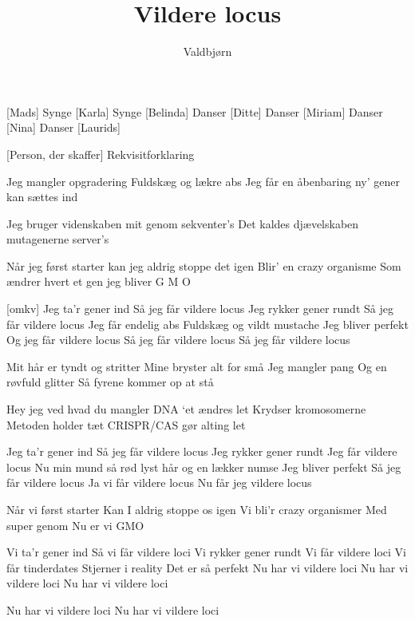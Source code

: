 \documentclass[a4paper,11pt]{article}
\title{Vildere locus}
\author{Valdbjørn}
\begin{document}
\maketitle

\begin{roles}
    [Mads] Synge
    [Karla] Synge 
    [Belinda] Danser
    [Ditte] Danser
    [Miriam] Danser
    [Nina] Danser
    [Laurids]
\end{roles}

\begin{props}
    [Person, der skaffer] Rekvisitforklaring
\end{props}

\begin{song}
  Jeg mangler opgradering
Fuldskæg og lækre abs
Jeg får en åbenbaring
ny’ gener kan sættes ind

  Jeg bruger videnskaben
mit genom sekventer’s
Det kaldes djævelskaben
mutagenerne server's

  Når jeg først starter
kan jeg aldrig stoppe det igen
Blir' en crazy organisme
Som ændrer hvert et gen
jeg bliver G M O

  [omkv]
Jeg ta’r gener ind
Så jeg får vildere locus
Jeg rykker gener rundt
Så jeg får vildere locus
Jeg får endelig abs
Fuldskæg og vildt mustache 
Jeg bliver perfekt
Og jeg får vildere locus
Så jeg får vildere locus
Så jeg får vildere locus

Mit hår er tyndt og stritter
Mine bryster alt for små
Jeg mangler pang
Og en røvfuld glitter
Så fyrene kommer op at stå

Hey jeg ved hvad du mangler
DNA ‘et ændres let
Krydser kromosomerne
Metoden holder tæt
CRISPR/CAS gør alting let

Jeg ta’r gener ind
Så jeg får vildere locus
Jeg rykker gener rundt
Jeg får vildere locus
Nu min mund så rød
lyst hår og en lækker numse 
Jeg bliver perfekt
Så jeg får vildere locus
Ja vi får vildere locus
Nu får jeg vildere locus

Når vi først starter
Kan I aldrig stoppe os igen
Vi bli'r crazy organismer
Med super genom 
Nu er vi GMO

  Vi ta’r gener ind
Så vi får vildere loci
Vi rykker gener rundt
Vi får vildere loci
Vi får tinderdates
Stjerner i reality  
Det er så perfekt 
Nu har vi vildere loci
Nu har vi vildere loci
Nu har vi vildere loci

Nu har vi vildere loci
Nu har vi vildere loci


\end{song}
\end{document}
